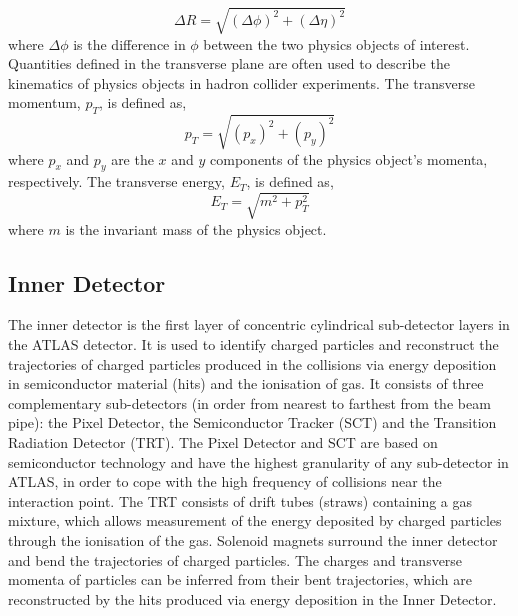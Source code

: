 \begin{equation}
\Delta R = \sqrt{(\Delta\phi)^{2} + (\Delta\eta)^{2}}
\end{equation}
where $\Delta\phi$ is the difference in $\phi$ between the two physics objects of interest. Quantities defined in the transverse plane are often used to describe the kinematics of physics objects in hadron collider experiments. The transverse momentum, $p_{T}$, is defined as,
\begin{equation}
p_{T}= \sqrt{(p_{x})^{2} + (p_{y})^{2}}
\end{equation}
where $p_{x}$ and $p_{y}$ are the $x$ and $y$ components of the physics object's momenta, respectively. The transverse energy, $E_{T}$, is defined as,
\begin{equation}
E_{T} = \sqrt{m^{2} + p_{T}^{2}}
\end{equation}
where $m$ is the invariant mass of the physics object. 



\subsection{Inner Detector}
The inner detector is the first layer of concentric cylindrical sub-detector layers in the ATLAS detector. It is used to identify charged particles and reconstruct the trajectories of charged particles produced in the collisions via energy deposition in semiconductor material (hits) and the ionisation of gas. It consists of three complementary sub-detectors (in order from nearest to farthest from the beam pipe): the Pixel Detector, the Semiconductor Tracker (SCT) and the Transition Radiation Detector (TRT). The Pixel Detector and SCT are based on semiconductor technology and have the highest granularity of any sub-detector in ATLAS, in order to cope with the high frequency of collisions near the interaction point. The TRT consists of drift tubes (straws) containing a gas mixture, which allows measurement of the energy deposited by charged particles through the ionisation of the gas. Solenoid magnets surround the inner detector and bend the trajectories of charged particles. The charges and transverse momenta of particles can be inferred from their bent trajectories, which are reconstructed by the hits produced via energy deposition in the Inner Detector.

